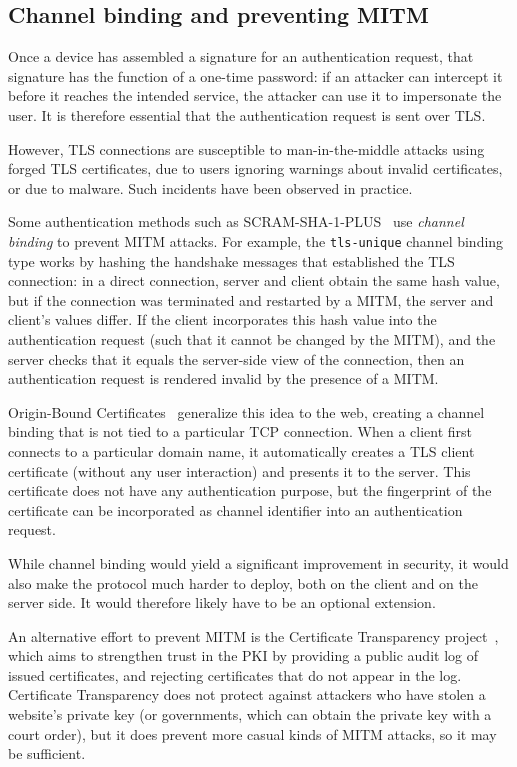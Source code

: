 \subsection{Channel binding and preventing MITM}

Once a device has assembled a signature for an authentication request, that signature has the
function of a one-time password: if an attacker can intercept it before it reaches the intended
service, the attacker can use it to impersonate the user. It is therefore essential that the
authentication request is sent over TLS.

However, TLS connections are susceptible to man-in-the-middle attacks using forged TLS certificates,
due to users ignoring warnings about invalid certificates, or due to malware. Such incidents have
been observed in practice.~\cite{Huang14, Adkins11}

Some authentication methods such as SCRAM-SHA-1-PLUS~\cite{SCRAM} use \emph{channel binding} to
prevent MITM attacks. For example, the \texttt{tls-unique} channel binding type works by hashing the
handshake messages that established the TLS connection: in a direct connection, server and client
obtain the same hash value, but if the connection was terminated and restarted by a MITM, the server
and client's values differ. If the client incorporates this hash value into the authentication
request (such that it cannot be changed by the MITM), and the server checks that it equals the
server-side view of the connection, then an authentication request is rendered invalid by the
presence of a MITM.

Origin-Bound Certificates~\cite{Dietz12} generalize this idea to the web, creating a channel
binding that is not tied to a particular TCP connection. When a client first connects to a
particular domain name, it automatically creates a TLS client certificate (without any user
interaction) and presents it to the server. This certificate does not have any authentication
purpose, but the fingerprint of the certificate can be incorporated as channel identifier into an
authentication request.

While channel binding would yield a significant improvement in security, it would also make the
protocol much harder to deploy, both on the client and on the server side. It would therefore likely
have to be an optional extension.

An alternative effort to prevent MITM is the Certificate Transparency project~\cite{CertTrans},
which aims to strengthen trust in the PKI by providing a public audit log of issued certificates,
and rejecting certificates that do not appear in the log. Certificate Transparency does not protect
against attackers who have stolen a website's private key (or governments, which can obtain the
private key with a court order), but it does prevent more casual kinds of MITM attacks, so it may be
sufficient.
